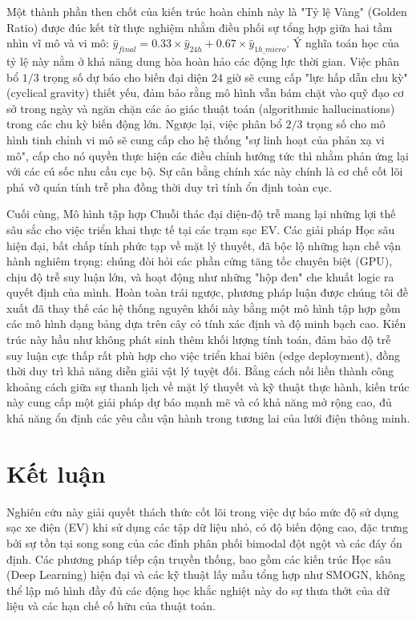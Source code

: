 \documentclass[pdflatex,sn-mathphys-num]{sn-jnl}%
\theoremstyle{thmstyleone}%
\theoremstyle{thmstyletwo}%
\theoremstyle{thmstylethree}%
\begin{document}
Một thành phần then chốt của kiến trúc hoàn chỉnh này là "Tỷ lệ Vàng" (Golden Ratio) được đúc kết từ thực nghiệm nhằm điều phối sự tổng hợp giữa hai tầm nhìn vĩ mô và vi mô: $\hat{y}_{final} = 0.33 \times \hat{y}_{24h} + 0.67 \times \hat{y}_{1h\_micro}$. Ý nghĩa toán học của tỷ lệ này nằm ở khả năng dung hòa hoàn hảo các động lực thời gian. Việc phân bổ $1/3$ trọng số dự báo cho biến đại diện 24 giờ sẽ cung cấp "lực hấp dẫn chu kỳ" (cyclical gravity) thiết yếu, đảm bảo rằng mô hình vẫn bám chặt vào quỹ đạo cơ sở trong ngày và ngăn chặn các ảo giác thuật toán (algorithmic hallucinations) trong các chu kỳ biến động lớn. Ngược lại, việc phân bổ $2/3$ trọng số cho mô hình tinh chỉnh vi mô sẽ cung cấp cho hệ thống "sự linh hoạt của phản xạ vi mô", cấp cho nó quyền thực hiện các điều chỉnh hướng tức thì nhằm phản ứng lại với các cú sốc nhu cầu cục bộ. Sự cân bằng chính xác này chính là cơ chế cốt lõi phá vỡ quán tính trễ pha đồng thời duy trì tính ổn định toàn cục.

Cuối cùng, Mô hình tập hợp Chuỗi thác đại diện-độ trễ mang lại những lợi thế sâu sắc cho việc triển khai thực tế tại các trạm sạc EV. Các giải pháp Học sâu hiện đại, bất chấp tính phức tạp về mặt lý thuyết, đã bộc lộ những hạn chế vận hành nghiêm trọng: chúng đòi hỏi các phần cứng tăng tốc chuyên biệt (GPU), chịu độ trễ suy luận lớn, và hoạt động như những "hộp đen" che khuất logic ra quyết định của mình. Hoàn toàn trái ngược, phương pháp luận được chúng tôi đề xuất đã thay thế các hệ thống nguyên khối này bằng một mô hình tập hợp gồm các mô hình dạng bảng dựa trên cây có tính xác định và độ minh bạch cao. Kiến trúc này hầu như không phát sinh thêm khối lượng tính toán, đảm bảo độ trễ suy luận cực thấp rất phù hợp cho việc triển khai biên (edge deployment), đồng thời duy trì khả năng diễn giải vật lý tuyệt đối. Bằng cách nối liền thành công khoảng cách giữa sự thanh lịch về mặt lý thuyết và kỹ thuật thực hành, kiến trúc này cung cấp một giải pháp dự báo mạnh mẽ và có khả năng mở rộng cao, đủ khả năng ổn định các yêu cầu vận hành trong tương lai của lưới điện thông minh.
\section{Kết luận}\label{sec4}
Nghiên cứu này giải quyết thách thức cốt lõi trong việc dự báo mức độ sử dụng sạc xe điện (EV) khi sử dụng các tập dữ liệu nhỏ, có độ biến động cao, đặc trưng bởi sự tồn tại song song của các đỉnh phân phối bimodal đột ngột và các đáy ổn định. Các phương pháp tiếp cận truyền thống, bao gồm các kiến trúc Học sâu (Deep Learning) hiện đại và các kỹ thuật lấy mẫu tổng hợp như SMOGN, không thể lập mô hình đầy đủ các động học khắc nghiệt này do sự thưa thớt của dữ liệu và các hạn chế cố hữu của thuật toán. 
\end{document}
